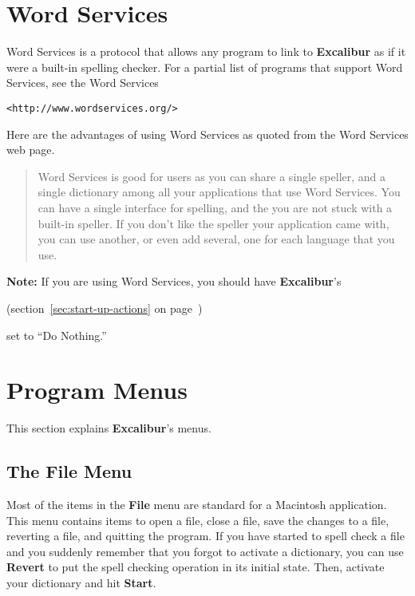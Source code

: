 \documentclass[11pt,titlepage]{article}
\newcommand{\ex}{\textbf{Excalibur}}
\begin{document}
\section{Word Services}
\label{sec:word-services}

Word Services is a protocol that allows any program to link to \ex{}
as if it were a built-in spelling checker.  For a partial list of
programs that support Word Services, see the Word Services
\begin{latexonly}
\begin{verbatim}
<http://www.wordservices.org/>
\end{verbatim}
\end{latexonly}

Here are the advantages of using Word Services as quoted from the Word
Services web page.

\begin{quote}
  Word Services is good for users as you can share a single speller,
  and a single dictionary among all your applications that use Word
  Services. You can have a single interface for spelling, and the you
  are not stuck with a built-in speller. If you don't like the speller
  your application came with, you can use another, or even add
  several, one for each language that you use.
\end{quote}

\textbf{Note:} If you are using Word Services, you should have \ex's
\begin{latexonly}
  (section~\ref{sec:start-up-actions} on
  page~\pageref{sec:start-up-actions})
\end{latexonly}
set to ``Do Nothing.''

\section{Program Menus}

This section explains \ex's menus.

\subsection{The File Menu}

Most of the items in the \textbf{File} menu are standard for a
Macintosh application. This menu contains items to open a file, close
a file, save the changes to a file, reverting a file, and quitting the
program.  If you have started to spell check a file and you suddenly
remember that you forgot to activate a dictionary, you can use
\textbf{Revert} to put the spell checking operation in its initial
state.  Then, activate your dictionary and hit \textbf{Start}.
\end{document}
